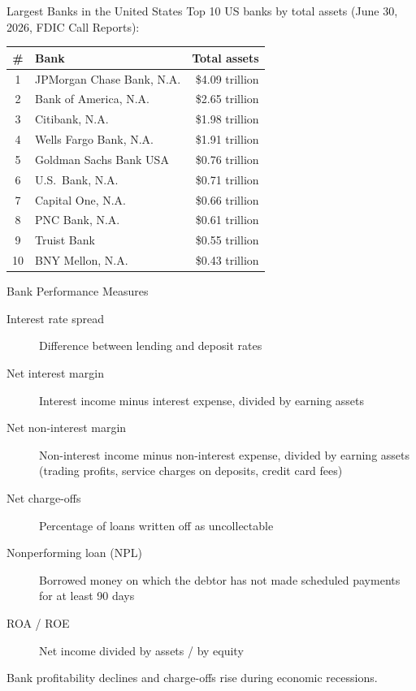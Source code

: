 \documentclass[aspectratio=169]{beamer}
\begin{document}
\begin{frame}{Largest Banks in the United States}
Top 10 US banks by total assets (June 30, 2026, FDIC Call Reports):
\begin{table}
\centering
\footnotesize
\begin{tabular}{clr}
\toprule
\textbf{\#} & \textbf{Bank} & \textbf{Total assets} \\
\midrule
1 & JPMorgan Chase Bank, N.A. & \$4.09 trillion \\
2 & Bank of America, N.A. & \$2.65 trillion \\
3 & Citibank, N.A. & \$1.98 trillion \\
4 & Wells Fargo Bank, N.A. & \$1.91 trillion \\
5 & Goldman Sachs Bank USA & \$0.76 trillion \\
6 & U.S.\ Bank, N.A. & \$0.71 trillion \\
7 & Capital One, N.A. & \$0.66 trillion \\
8 & PNC Bank, N.A. & \$0.61 trillion \\
9 & Truist Bank & \$0.55 trillion \\
10 & BNY Mellon, N.A. & \$0.43 trillion \\
\bottomrule
\end{tabular}
\end{table}
\end{frame}

\begin{frame}{Bank Performance Measures}
\begin{description}
  \item[Interest rate spread] Difference between lending and deposit rates
  \item[Net interest margin] Interest income minus interest expense, divided by earning assets
  \item[Net non-interest margin] Non-interest income minus non-interest expense, divided by earning assets (trading profits, service charges on deposits, credit card fees)
  \item[Net charge-offs] Percentage of loans written off as uncollectable
  \item[Nonperforming loan (NPL)] Borrowed money on which the debtor has not made scheduled payments for at least 90 days
  \item[ROA / ROE] Net income divided by assets / by equity
\end{description}
\vspace{0.2em}
Bank profitability declines and charge-offs rise during economic recessions.
\end{frame}
\end{document}
